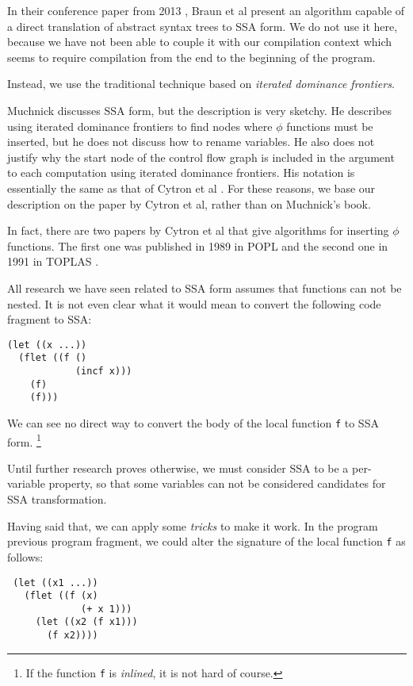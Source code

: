 In their conference paper from 2013
\cite{Braun:2013:SEC:2450247.2450258}, Braun et al present an
algorithm capable of a direct translation of abstract syntax trees to
SSA form.  We do not use it here, because we have not been able to
couple it with our compilation context which seems to require
compilation from the end to the beginning of the program. 

Instead, we use the traditional technique based on \emph{iterated
  dominance frontiers}.

Muchnick \cite{Muchnick:1998:ACD:286076} discusses SSA form, but the
description is very sketchy.  He describes using iterated dominance
frontiers to find nodes where $\phi$ functions must be inserted, but
he does not discuss how to rename variables.  He also does not justify
why the start node of the control flow graph is included in the
argument to each computation using iterated dominance frontiers.  His
notation is essentially the same as that of Cytron et al
\cite{Cytron:1991:ECS:115372.115320}.  For these reasons, we base our
description on the paper by Cytron et al, rather than on Muchnick's
book.

In fact, there are two papers by Cytron et al that give algorithms for
inserting $\phi$ functions.  The first one was published in 1989 in
POPL \cite{Cytron:1989:EMC:75277.75280} and the second one in 1991 in
TOPLAS \cite{Cytron:1991:ECS:115372.115320}.

All research we have seen related to SSA form assumes that functions
can not be nested.  It is not even clear what it would mean to convert
the following code fragment to SSA:

\begin{verbatim}
(let ((x ...))
  (flet ((f ()
            (incf x)))
    (f)
    (f)))
\end{verbatim}

We can see no direct way to convert the body of the local function
\texttt{f} to SSA form.%
\footnote{If the function \texttt{f} is \emph{inlined}, it is not hard
  of course.}

Until further research proves otherwise, we must consider SSA to be a
per-variable property, so that some variables can not be considered
candidates for SSA transformation.

Having said that, we can apply some \emph{tricks} to make it work.  In
the program previous program fragment, we could alter the signature of
the local function \texttt{f} as follows:

\begin{verbatim}
 (let ((x1 ...))
   (flet ((f (x)
             (+ x 1)))
     (let ((x2 (f x1)))
       (f x2))))
\end{verbatim}

